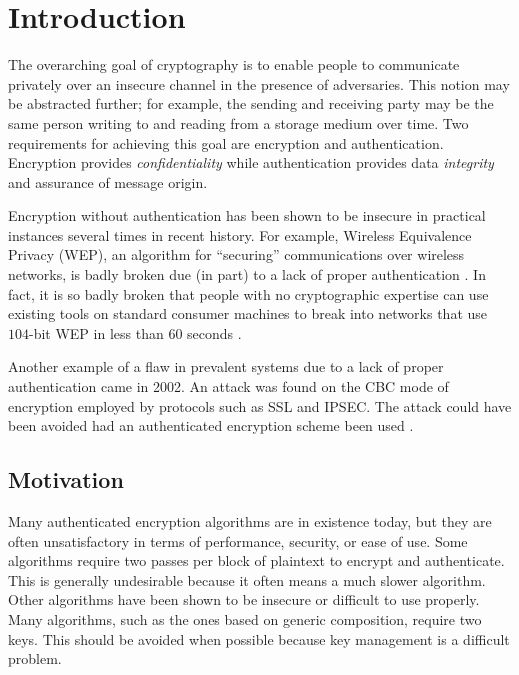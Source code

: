 \chapter{Introduction}
\label{ch:Intro}
The overarching goal of cryptography is to enable people to communicate privately over an insecure channel in the presence of adversaries.
This notion may be abstracted further; for example, the sending and receiving party may be the same person writing to and reading from a storage medium over time.
Two requirements for achieving this goal are encryption and authentication.
Encryption provides \textit{confidentiality} while authentication provides data \textit{integrity} and assurance of message origin.

Encryption without authentication has been shown to be insecure in practical instances several times in recent history.
For example, Wireless Equivalence Privacy (WEP), an algorithm for ``securing'' communications over wireless networks, is badly broken due (in part) to a lack of proper authentication \cite{Borisov2001_WEP}.
In fact, it is so badly broken that people with no cryptographic expertise can use existing tools on standard consumer machines to break into networks that use $104$-bit WEP in less than $60$ seconds \cite{Tews2007_BreakingWEP}.

Another example of a flaw in prevalent systems due to a lack of proper authentication came in 2002.
An attack was found on the CBC mode of encryption employed by protocols such as SSL and IPSEC.
The attack could have been avoided had an authenticated encryption scheme been used \cite{Vaudenay2002_CBC_Flaws}.

\section{Motivation}
Many authenticated encryption algorithms are in existence today, but they are often unsatisfactory in terms of performance, security, or ease of use.
Some algorithms require two passes per block of plaintext to encrypt and authenticate.
This is generally undesirable because it often means a much slower algorithm.
Other algorithms have been shown to be insecure or difficult to use properly.
Many algorithms, such as the ones based on generic composition, require two keys.
This should be avoided when possible because key management is a difficult problem.

